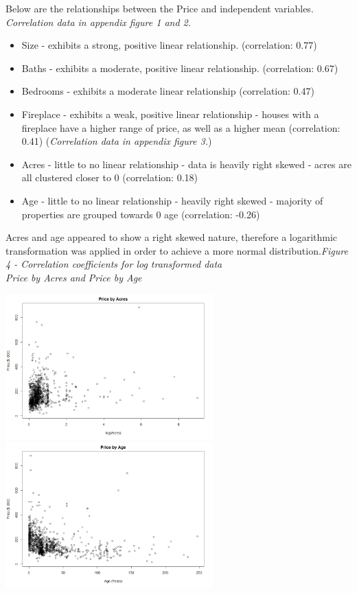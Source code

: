 \documentclass[10pt,A4,makeidx]{article}
\begin{document}
  Below are the relationships between the Price and independent variables.\\
  \emph{Correlation data in appendix figure 1 and 2.}
  \begin{itemize}
    \item Size - exhibits a strong, positive linear relationship. (correlation: 0.77)
    \item Baths - exhibits a moderate, positive linear relationship. (correlation: 0.67)
    \item Bedrooms - exhibits a moderate linear relationship (correlation: 0.47)
    \item Fireplace - exhibits a weak, positive linear relationship - houses 
    with a fireplace have a higher range of price, as well as a higher mean (correlation: 0.41)
    (\emph{Correlation data in appendix figure 3.})
    \item Acres - little to no linear relationship - data is heavily right skewed 
      \subitem - acres are all clustered closer to 0 (correlation: 0.18)
    \item Age - little to no linear relationship - heavily right skewed
      \subitem - majority of properties are grouped
    towards 0 age (correlation: -0.26)\\
  \end{itemize}
  
  Acres and age appeared to show a right skewed nature, therefore a logarithmic transformation was applied
  in order to achieve a more normal distribution.\emph{Figure 4 - Correlation coefficients for log transformed data}\\
  
  \emph{Price by Acres and Price by Age}\\
  \begin{center}
    \includegraphics[width=8cm]{price-acres.png}
    \includegraphics[width=8cm]{price-age.png}
  \end{center}
  
\end{document}

